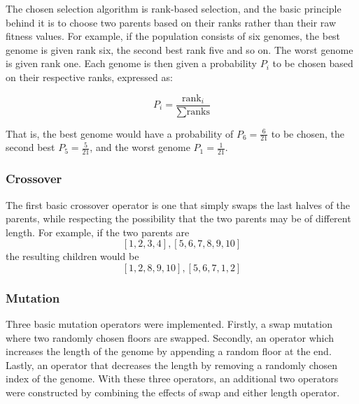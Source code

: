 The chosen selection algorithm is rank-based selection, and the basic principle behind it is to choose two parents based on their ranks rather than their raw fitness values. For example, if the population consists of six genomes, the best genome is given rank six, the second best rank five and so on. The worst genome is given rank one. Each genome is then given a probability $ P_i $ to be chosen based on their respective ranks, expressed as:

$$ P_i = \frac{\text{rank}_i}{\sum \text{ranks}} $$

That is, the best genome would have a probability of $ P_6 = \frac{6}{21} $ to be chosen, the second best $ P_5 = \frac{5}{21} $, and the worst genome $ P_1 = \frac{1}{21} $.

\subsubsection{Crossover}
\begin{par}
	The first basic crossover operator is one that simply swaps the last halves of the parents, while respecting the possibility that the two parents may be of different length. For example, if the two parents are
	\[
		[1, 2, 3, 4], [5, 6, 7, 8, 9, 10]
	\]
	the resulting children would be
	\[
		[1, 2, 8, 9, 10], [5, 6, 7, 1, 2]
	\]
	\label{par:swap last halves}
\end{par}



\subsubsection{Mutation}

Three basic mutation operators were implemented. Firstly, a swap mutation where two randomly chosen floors are swapped. Secondly, an operator which increases the length of the genome by appending a random floor at the end. Lastly, an operator that decreases the length by removing a randomly chosen index of the genome. With these three operators, an additional two operators were constructed by combining the effects of swap and either length operator.


